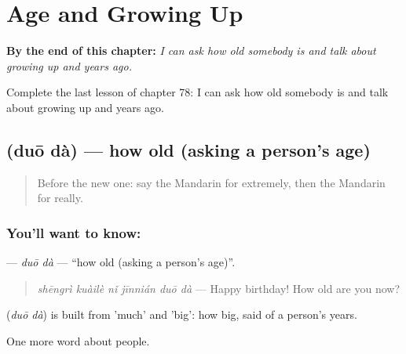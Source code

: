 
\chapter{Age and Growing Up}
\label{ch:zh-age-and-growing-up}

\begin{chapteropening}
\textbf{By the end of this chapter:} \emph{I can ask how old somebody is and talk about growing up and years ago.}

Complete the last lesson of chapter 78: I can ask how old somebody is and talk about growing up and years ago.
\end{chapteropening}

\section[\texorpdfstring{\zh{多大} (duō dà)}{多大 (duō dà)}]{ (duō dà) — how old (asking a person's age)}

\label{lesson:ZH-C78-duoda}



\begin{quote}
Before the new one: say the Mandarin for extremely, then the Mandarin for really.
\end{quote}

\subsection*{You'll want to know: }
\textbf{} — \emph{duō dà} — \textquotedblleft{}how old (asking a person's age)\textquotedblright{}.

\begin{quote}
\textbf{} \emph{shēngrì kuàilè nǐ jīnnián duō dà} — Happy birthday! How old are you now?
\end{quote}

\begin{cousinweb}
\textbf{} (\emph{duō dà}) is built from  'much' and  'big': how big, said of a person's years.
\end{cousinweb}

\begin{grammarlens}[title={What you've built}]
One more word about people.
\end{grammarlens}

